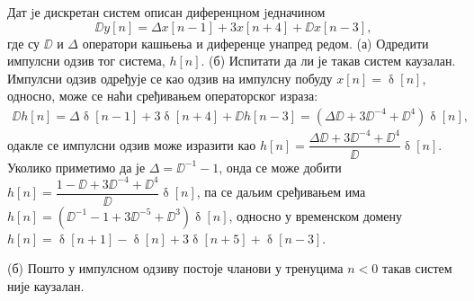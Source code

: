 \PID Дат jе дискретан систем описан диференцном jедначином
\begin{equation}
    \DD y[n] = \Delta x[n - 1] + 3x[n + 4] + \DD x[n - 3],
\end{equation}
где су $\DD$ и $\Delta$ 
оператори кашњења и диференце унапред редом. 
(а) Одредити импулсни одзив тог система, $h[n]$.
(б) Испитати да ли је такав систем каузалан.
\\[2mm]

\RESENJE  Импулсни одзив одређује се као одзив на 
импулсну побуду $x[n] = \updelta[n]$, 
односно, може се наћи сређивањем операторског израза:
\begin{align}
    \DD h[n] 
    = \Delta \updelta[n - 1] + 3\updelta[n + 4] + \DD h[n - 3] 
    = (\Delta\DD + 3 \DD^{-4} + \DD^{4})\updelta[n],
\end{align}
одакле се импулсни одзив може изразити као 
$h[n] = \dfrac{\Delta\DD + 3 \DD^{-4} + \DD^{4}}{\DD} \updelta[n]$.
Уколико приметимо да је $\Delta = \DD^{-1} - 1$, онда се може добити 
$h[n] = \dfrac{ 1 - \DD + 3\DD^{-4} + \DD^4 }{\DD} \updelta[n]$, па се 
даљим сређивањем има 
$h[n] = (\DD^{-1} - 1 + 3\DD^{-5} + \DD^3) \updelta[n]$, односно у временском домену
$h[n] = \updelta[n + 1] - \updelta[n] + 3\updelta[n + 5] + \updelta[n - 3]$.

(б) Пошто у импулсном одзиву постоје чланови у тренуцима $n < 0$ 
такав систем није каузалан.

